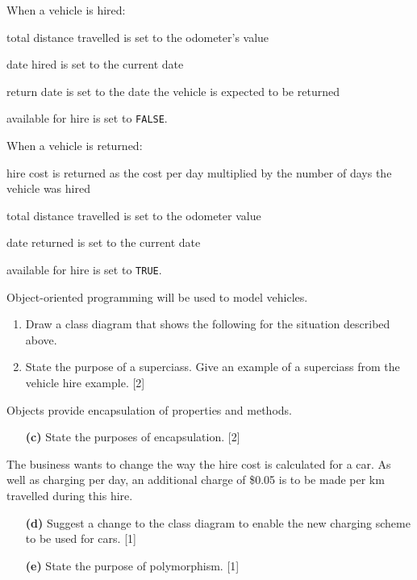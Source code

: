 When a vehicle is hired: 
\begin{itemize}
\begin{singlespace}
\item total distance travelled is set to the odometer's value
\item date hired is set to the current date
\item return date is set to the date the vehicle is expected to be returned 
\item available for hire is set to \texttt{FALSE}. 
\end{singlespace}
\end{itemize}
When a vehicle is returned: 
\begin{itemize}
\begin{singlespace}
\item hire cost is returned as the cost per day multiplied by the number
of days the vehicle was hired 
\item total distance travelled is set to the odometer value 
\item date returned is set to the current date 
\item available for hire is set to \texttt{TRUE}.
\end{singlespace}
\end{itemize}
Object-oriented programming will be used to model vehicles. 
\begin{enumerate}
\item Draw a class diagram that shows the following for the situation described
above. 
\begin{itemize}
\end{itemize}
\item State the purpose of a superciass. Give an example of a superciass
from the vehicle hire example. \hfill{} {[}2{]}
\end{enumerate}
Objects provide encapsulation of properties and methods.
\begin{enumerate}
\item[\textbf{(c)}] State the purposes of encapsulation. \hfill{} {[}2{]}
\end{enumerate}
The business wants to change the way the hire cost is calculated for
a car. As well as charging per day, an additional charge of \$0.05
is to be made per km travelled during this hire.
\begin{enumerate}
\item[\textbf{(d)}] Suggest a change to the class diagram to enable the new charging
scheme to be used for cars. \hfill{} {[}1{]}
\item[\textbf{(e)}] State the purpose of polymorphism. \hfill{} {[}1{]}
\end{enumerate}